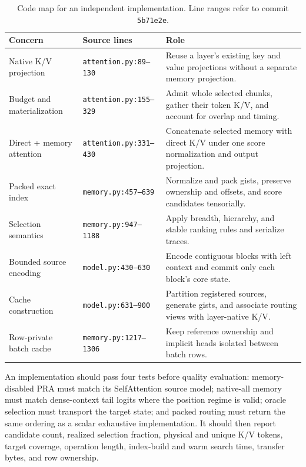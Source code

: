 \documentclass[11pt]{article}
\begin{document}
\begin{table}[H]
\centering
\small
\caption{Code map for an independent implementation. Line ranges refer to commit
\texttt{5b71e2e}.}
\label{tab:code-map}
\begin{tabularx}{\textwidth}{l l X}
\toprule
Concern & Source lines & Role \\
\midrule
Native K/V projection & \texttt{attention.py:89--130} & Reuse a layer's existing key and
value projections without a separate memory projection. \\
Budget and materialization & \texttt{attention.py:155--329} & Admit whole selected chunks,
gather their token K/V, and account for overlap and timing. \\
Direct + memory attention & \texttt{attention.py:331--430} & Concatenate selected memory
with direct K/V under one score normalization and output projection. \\
Packed exact index & \texttt{memory.py:457--639} & Normalize and pack gists, preserve
ownership and offsets, and score candidates tensorially. \\
Selection semantics & \texttt{memory.py:947--1188} & Apply breadth, hierarchy, and stable
ranking rules and serialize traces. \\
Bounded source encoding & \texttt{model.py:430--630} & Encode contiguous blocks with left
context and commit only each block's core state. \\
Cache construction & \texttt{model.py:631--900} & Partition registered sources, generate
gists, and associate routing views with layer-native K/V. \\
Row-private batch cache & \texttt{memory.py:1217--1306} & Keep reference ownership and
implicit heads isolated between batch rows. \\
\bottomrule
\end{tabularx}
\end{table}

An implementation should pass four tests before quality evaluation: memory-disabled PRA
must match its SelfAttention source model; native-all memory must match dense-context tail
logits where the position regime is valid; oracle selection must transport the target
state; and packed routing must return the same ordering as a scalar exhaustive
implementation. It should then report candidate count, realized selection fraction,
physical and unique K/V tokens, target coverage, operation length, index-build and warm
search time, transfer bytes, and row ownership.

{\small


}
\end{document}
